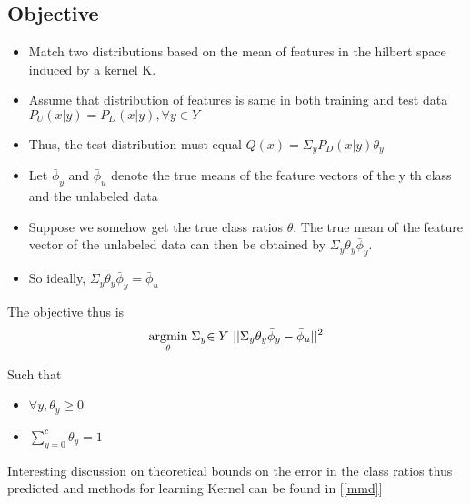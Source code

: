\subsection{Objective}
\begin{itemize}
  \item Match two distributions based on the mean of features in the hilbert space induced by a kernel K. \medskip
  \item Assume that distribution of features is same in both training and test data
    $P_U (x|y) = P_D (x|y), \forall y \in Y$ \medskip
  \item Thus, the test distribution must equal $Q(x) = \Sigma_{y} P_D (x|y)\theta_y$  \medskip
 \end{itemize}
 
 \begin{itemize}
  \item Let $\bar{\phi}_y$ and $\bar{\phi}_u$ denote the true means of the feature vectors of the y th class and the
unlabeled data \medskip
  \item Suppose we somehow get the true class ratios ${\theta}$. The true mean of the feature vector of the
  unlabeled data can then be obtained by $\Sigma_y\theta_y\bar{\phi}_y$. \medskip
  \item So ideally, $\Sigma_y\theta_y\bar{\phi}_y = \bar{\phi}_u$ \medskip
 \end{itemize}
 The objective thus is
  \begin{equation}
  \underset{\theta}{\operatorname{arg}\!\operatorname{min}}\;\Sigma_y{ \in Y\text{  } }|| \Sigma_y\theta_y\bar{\phi}_y - \bar{\phi}_u || ^ {2}  
  \end{equation}
  \begin{center}
  Such that 
  \begin{itemize}
   \item \begin{center} $\forall y, \theta_y \geq 0$ \end{center}
  \item \begin{center} $\sum_{y = 0}^c \theta_y = 1$ \end{center} 
  \end{itemize}
  \end{center}
  

Interesting discussion on theoretical bounds on the error in the class ratios thus predicted and
methods for learning Kernel can be found in [\ref{mmd}]

